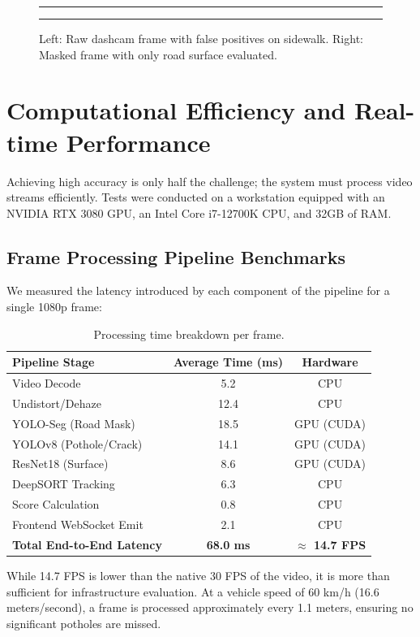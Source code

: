 \begin{figure}[H]
    \centering
    \rule{0.45\textwidth}{4cm} \hfill \rule{0.45\textwidth}{4cm}
    \caption{Left: Raw dashcam frame with false positives on sidewalk. Right: Masked frame with only road surface evaluated.}
    \label{fig:segmentation}
\end{figure}

\section{Computational Efficiency and Real-time Performance}
Achieving high accuracy is only half the challenge; the system must process video streams efficiently. Tests were conducted on a workstation equipped with an NVIDIA RTX 3080 GPU, an Intel Core i7-12700K CPU, and 32GB of RAM.

\subsection{Frame Processing Pipeline Benchmarks}
We measured the latency introduced by each component of the pipeline for a single 1080p frame:
\begin{table}[H]
    \centering
    \begin{tabular}{@{}lcc@{}}
        \toprule
        \textbf{Pipeline Stage} & \textbf{Average Time (ms)} & \textbf{Hardware} \\
        \midrule
        Video Decode & 5.2 & CPU \\
        Undistort/Dehaze & 12.4 & CPU \\
        YOLO-Seg (Road Mask) & 18.5 & GPU (CUDA) \\
        YOLOv8 (Pothole/Crack) & 14.1 & GPU (CUDA) \\
        ResNet18 (Surface) & 8.6 & GPU (CUDA) \\
        DeepSORT Tracking & 6.3 & CPU \\
        Score Calculation & 0.8 & CPU \\
        Frontend WebSocket Emit & 2.1 & CPU \\
        \midrule
        \textbf{Total End-to-End Latency} & \textbf{68.0 ms} & \textbf{$\approx$ 14.7 FPS} \\
        \bottomrule
    \end{tabular}
    \caption{Processing time breakdown per frame.}
    \label{tab:performance}
\end{table}

While 14.7 FPS is lower than the native 30 FPS of the video, it is more than sufficient for infrastructure evaluation. At a vehicle speed of 60 km/h (16.6 meters/second), a frame is processed approximately every 1.1 meters, ensuring no significant potholes are missed.

